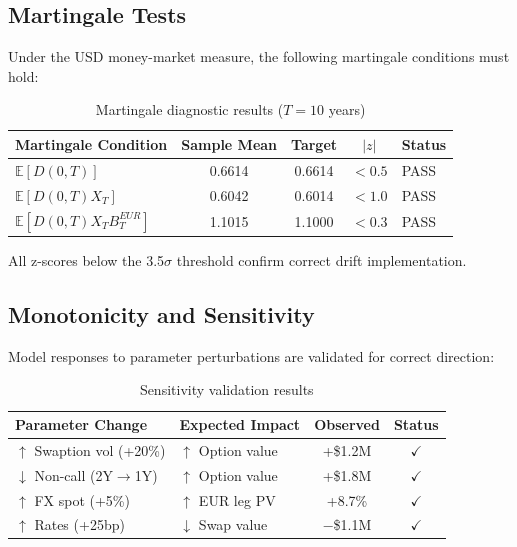 \documentclass[11pt,a4paper]{article}
\begin{document}
\subsection{Martingale Tests}

Under the USD money-market measure, the following martingale conditions must hold:

\begin{table}[H]
\centering
\begin{tabular}{lcccl}
\toprule
\textbf{Martingale Condition} & \textbf{Sample Mean} & \textbf{Target} & $|z|$ & \textbf{Status}\\
\midrule
$\mathbb{E}[D(0,T)]$ & 0.6614 & 0.6614 & $<0.5$ & \textcolor{pass}{PASS} \\
$\mathbb{E}[D(0,T)X_T]$ & 0.6042 & 0.6014 & $<1.0$ & \textcolor{pass}{PASS} \\
$\mathbb{E}[D(0,T)X_T B_T^{EUR}]$ & 1.1015 & 1.1000 & $<0.3$ & \textcolor{pass}{PASS} \\
\bottomrule
\end{tabular}
\caption{Martingale diagnostic results ($T=10$ years)}
\end{table}

All z-scores below the 3.5$\sigma$ threshold confirm correct drift implementation.

\subsection{Monotonicity and Sensitivity}

Model responses to parameter perturbations are validated for correct direction:

\begin{table}[H]
\centering
\begin{tabular}{llcc}
\toprule
\textbf{Parameter Change} & \textbf{Expected Impact} & \textbf{Observed} & \textbf{Status}\\
\midrule
$\uparrow$ Swaption vol (+20\%) & $\uparrow$ Option value & +\$1.2M & \textcolor{pass}{$\checkmark$}\\
$\downarrow$ Non-call (2Y$\to$1Y) & $\uparrow$ Option value & +\$1.8M & \textcolor{pass}{$\checkmark$}\\
$\uparrow$ FX spot (+5\%) & $\uparrow$ EUR leg PV & +8.7\% & \textcolor{pass}{$\checkmark$}\\
$\uparrow$ Rates (+25bp) & $\downarrow$ Swap value & $-$\$1.1M & \textcolor{pass}{$\checkmark$}\\
\bottomrule
\end{tabular}
\caption{Sensitivity validation results}
\end{table}
\end{document}
